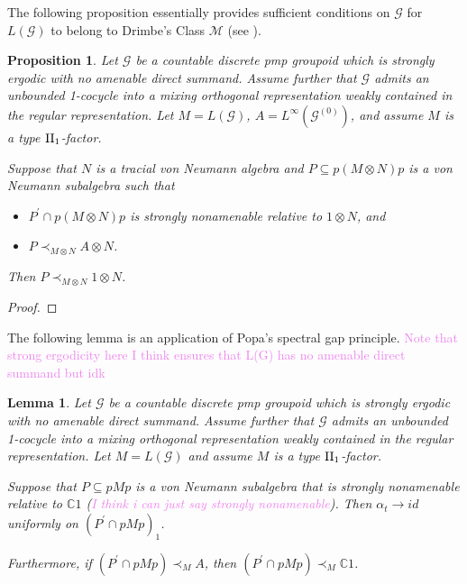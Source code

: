 \documentclass[a4paper,11pt]{article}
\numberwithin{equation}{section}
\newtheorem{lem}[thm]{Lemma}
\newtheorem{prop}[thm]{Proposition}
\theoremstyle{definition}
\theoremstyle{remark}
\numberwithin{equation}{section}
\newcommand{\rG}{\mathcal{G}}
\newcommand{\C}{\mathbb{C}}
\def\sub{\subseteq}
\newcommand{\mc}[1]{\mathcal{#1}}
\numberwithin{equation}{section}
\begin{document}
The following proposition essentially provides sufficient conditions on $ \rG $ for $ L(\rG) $ to belong to Drimbe's Class $ \mc{M} $ (see \cite[Definition 3.2]{drimbe:21}). 

\begin{prop}
    Let $\rG$ be a countable discrete pmp groupoid which is strongly ergodic with no amenable direct summand. Assume further that $ \rG $ admits an unbounded 1-cocycle into a mixing orthogonal representation weakly contained in the regular representation. Let $ M = L(\rG) $, $ A = L^{\infty}(\rG^{(0)}) $, and assume $ M $ is a type $ \rm{II}_{1} $-factor.

    Suppose that $ N $ is a tracial von Neumann algebra and $ P\sub p(M\otimes N)p $ is a von Neumann subalgebra such that
    \begin{itemize}[noitemsep, topsep=1pt]
        \item $ P^{\prime}\cap p(M\otimes N)p $ is strongly nonamenable relative to $ 1\otimes N $, and
        \item $ P\prec_{M\otimes N} A\otimes N $.
    \end{itemize}
    Then $ P\prec_{M\otimes N} 1\otimes N$.
\end{prop}

\begin{proof}
    
\end{proof}



The following lemma is an application of Popa's spectral gap principle.
\textcolor{violet}{Note that strong ergodicity here I think ensures that L(G) has no amenable direct summand but idk}
\begin{lem}
    Let $\rG$ be a countable discrete pmp groupoid which is strongly ergodic with no amenable direct summand. Assume further that $ \rG $ admits an unbounded 1-cocycle into a mixing orthogonal representation weakly contained in the regular representation. Let $ M = L(\rG) $ and assume $ M $ is a type $ \rm{II}_{1} $-factor.

    Suppose that $ P\sub pMp $ is a von Neumann subalgebra that is strongly nonamenable relative to $ \C1 $ (\textcolor{violet}{I think i can just say strongly nonamenable}). Then $ \alpha_{t}\to id $ uniformly on $ (P^{\prime}\cap pMp)_{1} $.

    Furthermore, if $ (P^{\prime}\cap pMp)\prec_{M} A $, then $ (P^{\prime}\cap pMp) \prec_{M} \C1 $.
\end{lem}
\end{document}
